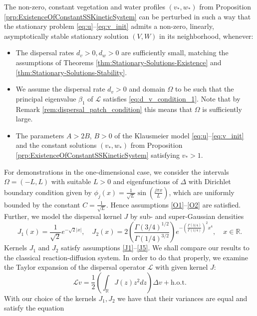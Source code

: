 \documentclass[review,onefignum,onetabnum]{SIAM-styles/siamart171218}
\begin{document}
The non-zero, constant vegetation and water profiles $(v_*, w_*)$ from Proposition \ref{prp:ExistenceOfConstantSSKineticSystem} can be perturbed in such a way that the stationary problem \eqref{eq:u}--\eqref{eq:v_init} admits a non-zero, linearly, asymptotically stable stationary solution $(V, W)$ in its neighborhood, whenever: 
\begin{itemize}
    \item[(A1)] The dispersal rates $d_v > 0, d_w > 0$ are sufficiently small, matching the assumptions of Theorems \ref{thm:Stationary-Solutions-Existence} and \ref{thm:Stationary-Solutions-Stability}.
    \item[(A2)] We assume the dispersal rate $d_v > 0$ and domain $\Omega$ to be such that the principal eigenvalue $\beta_1$ of $\mathcal{L}$ satisfies \eqref{eq:d_v_condition_1}. Note that by Remark \ref{rem:dispersal_patch_condition} this means that $\Omega$ is sufficiently large.
    \item[(A3)] The parameters $A > 2B$, $B > 0$ of the Klausmeier model \eqref{eq:u}--\eqref{eq:v_init} and the constant solutions $(v_*, w_*)$ from Proposition \ref{prp:ExistenceOfConstantSSKineticSystem} satisfying $v_* > 1$.
\end{itemize}
For demonstrations in the one-dimensional case, we consider the intervals $\Omega = (-L, L)$ with suitable $L > 0$ and eigenfunctions of $\Delta$ with Dirichlet boundary condition given by $\phi_j(x) = \frac{1}{\sqrt{L}}\sin(\frac{j\pi x}{L})$, which are uniformly bounded by the constant $C = \frac{1}{\sqrt{L}}$. Hence assumptions \ref{O1}--\ref{O2} are satisfied. Further, we model the dispersal kernel $J$ by sub- and super-Gaussian densities 
\begin{equation}
    \label{eq:1dGaussian_PDF}
    J_1(x) = \frac{1}{\sqrt{2}} e^{-\sqrt{2}|x|}, \quad
    J_2(x) = 2 \left(\frac{\Gamma(3/4)^{1/2}}{\Gamma(1/4)^{3/2}}\right) e^{- \left( \frac{\Gamma(3/4)}{\Gamma(1/4)}\right)^2 x^4}, \quad x \in \mathbb{R}.
\end{equation}
Kernels $J_1$ and $J_2$ satisfy assumptions \ref{J1}--\ref{J5}. We shall compare our results to the classical reaction-diffusion system. In order to do that properly, we examine the Taylor expansion of the dispersal operator $\mathcal{L}$ with given kernel $J$:
\begin{equation}
    \label{eq:dispersal_op_taylor_expansion}
    \mathcal{L} v = \frac{1}{2}\left(\int_{\mathbb{R}} J(z)z^2dz\right) \Delta v + \text{h.o.t.}
\end{equation}
With our choice of the kernels $J_1, J_2$ we have that their variances are equal and satisfy the equation
\end{document}
